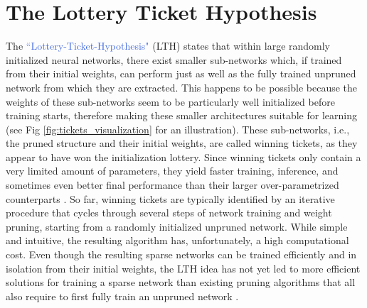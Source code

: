\section{The Lottery Ticket Hypothesis}
\label{sec06:intro}
The \textcolor{RoyalBlue}{``Lottery-Ticket-Hypothesis"} (LTH) \cite{frankle2018lottery} states that within large randomly initialized neural networks, there exist smaller sub-networks which, if trained from their initial weights, can perform just as well as the fully trained unpruned network from which they are extracted. This happens to be possible because the weights of these sub-networks seem to be particularly well initialized before training starts, therefore making these smaller architectures suitable for learning (see Fig \ref{fig:tickets_visualization} for an illustration). These sub-networks, i.e., the pruned structure and their initial weights, are called winning tickets, as they appear to have won the initialization lottery. Since winning tickets only contain a very limited amount of parameters, they yield faster training, inference, and sometimes even better final performance than their larger over-parametrized counterparts \cite{frankle2018lottery,franklestabilizing}. So far, winning tickets are typically identified by an iterative procedure that cycles through several steps of network training and weight pruning, starting from a randomly initialized unpruned network. While simple and intuitive, the resulting algorithm has, unfortunately, a high computational cost. Even though the resulting sparse networks can be trained efficiently and in isolation from their initial weights, the LTH idea has not yet led to more efficient solutions for training a sparse network than existing pruning algorithms that all also require to first fully train an unpruned network \cite{han2015deep,molchanov2016pruning,dong2017learning,lin2017runtime,zhuang2018discrimination}.

